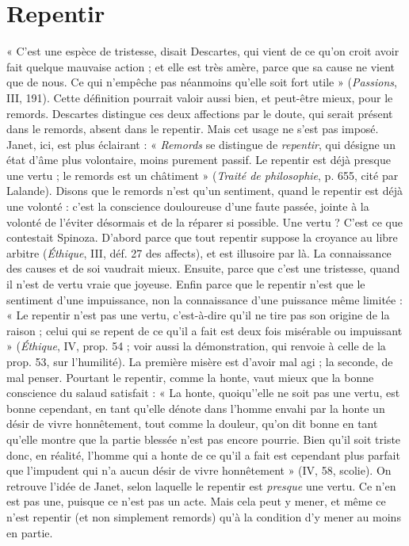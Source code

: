 \section{Repentir}
« C’est une espèce de tristesse, disait Descartes, qui vient de ce
qu’on croit avoir fait quelque mauvaise action ; et elle est très
amère, parce que sa cause ne vient que de nous. Ce qui n'empêche pas néanmoins
qu’elle soit fort utile » ({\it Passions}, III, 191). Cette définition pourrait
valoir aussi bien, et peut-être mieux, pour le remords. Descartes distingue ces
deux affections par le doute, qui serait présent dans le remords, absent dans
le repentir. Mais cet usage ne s’est pas imposé. Janet, ici, est plus éclairant :
« {\it Remords} se distingue de {\it repentir}, qui désigne un état d’âme plus volontaire,
moins purement passif. Le repentir est déjà presque une vertu ; le remords
est un châtiment » ({\it Traité de philosophie}, p. 655, cité par Lalande). Disons
que le remords n’est qu’un sentiment, quand le repentir est déjà une volonté :
c’est la conscience douloureuse d’une faute passée, jointe à la volonté de
l’éviter désormais et de la réparer si possible. Une vertu ? C’est ce que contestait
Spinoza. D'abord parce que tout repentir suppose la croyance au libre
arbitre ({\it Éthique}, III, déf. 27 des affects), et est illusoire par là. La connaissance
des causes et de soi vaudrait mieux. Ensuite, parce que c’est une tristesse,
quand il n’est de vertu vraie que joyeuse. Enfin parce que le repentir
n’est que le sentiment d’une impuissance, non la connaissance d’une puissance
même limitée : « Le repentir n’est pas une vertu, c’est-à-dire qu'il ne
tire pas son origine de la raison ; celui qui se repent de ce qu’il a fait est deux
fois misérable ou impuissant » ({\it Éthique}, IV, prop. 54 ; voir aussi la démonstration,
qui renvoie à celle de la prop. 53, sur l'humilité). La première misère
est d’avoir mal agi ; la seconde, de mal penser. Pourtant le repentir, comme
la honte, vaut mieux que la bonne conscience du salaud satisfait : « La honte,
quoiqu'’elle ne soit pas une vertu, est bonne cependant, en tant qu’elle dénote
dans l’homme envahi par la honte un désir de vivre honnêtement, tout
comme la douleur, qu’on dit bonne en tant qu’elle montre que la partie
blessée n’est pas encore pourrie. Bien qu’il soit triste donc, en réalité,
l’homme qui a honte de ce qu’il a fait est cependant plus parfait que l'impudent
qui n’a aucun désir de vivre honnêtement » (IV, 58, scolie). On retrouve
l'idée de Janet, selon laquelle le repentir est {\it presque} une vertu. Ce n’en est pas
une, puisque ce n’est pas un acte. Mais cela peut y mener, et même ce n'est
repentir (et non simplement remords) qu’à la condition d’y mener au moins
en partie.


